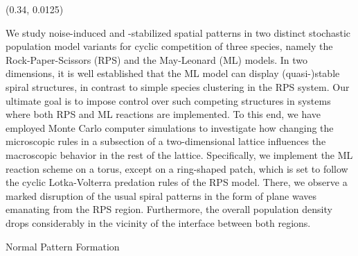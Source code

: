 \documentclass{beamer}
\begin{document}
\begin{frame}{}
\begin{textblock}{0.32}(0.34, 0.0125)
    \begin{block}{}
        \maketitle
        \centering
        We study noise-induced and -stabilized spatial patterns in two distinct stochastic 
        population model variants for cyclic competition of three species, namely the 
        Rock-Paper-Scissors (RPS) and the May-Leonard (ML) models. In two dimensions, 
        it is well established that the ML model can display (quasi-)stable spiral 
        structures, in contrast to simple species clustering in the RPS system. Our 
        ultimate goal is to impose control over such competing structures in systems 
        where both RPS and ML reactions are implemented. To this end, we have employed 
        Monte Carlo computer simulations to investigate how changing the microscopic 
        rules in a subsection of a two-dimensional lattice influences the macroscopic 
        behavior in the rest of the lattice. Specifically, we implement the ML reaction scheme 
        on a torus, except on a ring-shaped patch, which is set to follow the cyclic 
        Lotka-Volterra predation rules of the RPS model. There, we observe a marked disruption of 
        the usual spiral patterns in the form of plane waves emanating from the RPS region.
        Furthermore, the overall population density drops considerably in the 
        vicinity of the interface between both regions. 
    \end{block}
    \begin{block}{\centering Normal Pattern Formation}
        \begin{figure}[h]
            \centering

\end{figure}
\end{block}
\end{textblock}
\end{frame}
\end{document}
